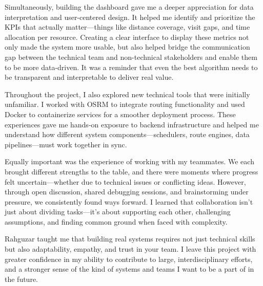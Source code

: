 \begin{itemize}
    Simultaneously, building the dashboard gave me a deeper appreciation for data interpretation and user-centered design. It helped me identify and prioritize the KPIs that actually matter—things like distance coverage, visit gaps, and time allocation per resource. Creating a clear interface to display these metrics not only made the system more usable, but also helped bridge the communication gap between the technical team and non-technical stakeholders and enable them to be more data-driven. It was a reminder that even the best algorithm needs to be transparent and interpretable to deliver real value.
    
    Throughout the project, I also explored new technical tools that were initially unfamiliar. I worked with OSRM to integrate routing functionality and used Docker to containerize services for a smoother deployment process. These experiences gave me hands-on exposure to backend infrastructure and helped me understand how different system components—schedulers, route engines, data pipelines—must work together in sync.
    
    Equally important was the experience of working with my teammates. We each brought different strengths to the table, and there were moments where progress felt uncertain—whether due to technical issues or conflicting ideas. However, through open discussion, shared debugging sessions, and brainstorming under pressure, we consistently found ways forward. I learned that collaboration isn't just about dividing tasks—it's about supporting each other, challenging assumptions, and finding common ground when faced with complexity.
    
    Rahguzar taught me that building real systems requires not just technical skills but also adaptability, empathy, and trust in your team. I leave this project with greater confidence in my ability to contribute to large, interdisciplinary efforts, and a stronger sense of the kind of systems and teams I want to be a part of in the future.
    
\end{itemize}

